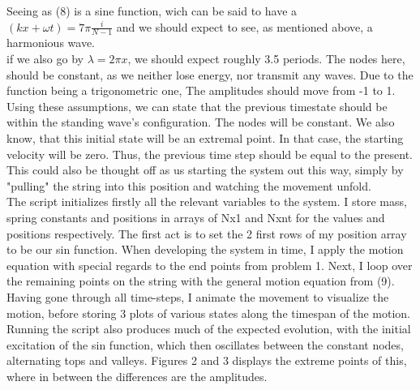 \documentclass[12pt]{article}
\begin{document}
	Seeing as (8) is a sine function, wich can be said to have a \\$(kx + \omega t) = 7\pi\frac{i}{N-1}$ and we should expect to see, as mentioned above, a harmonious wave.\\
	if we also go by $\lambda = 2\pi x$, we should expect roughly 3.5 periods. The nodes here, should be constant, as we neither lose energy, nor transmit any waves. Due to the function being a trigonometric one, The amplitudes should move from -1 to 1.
	Using these assumptions, we can state that the previous timestate should be within the standing wave's configuration. The nodes will be constant. We also know, that this initial state will be an extremal point. In that case, the starting velocity will be zero. Thus, the previous time step should be equal to the present. This could also be thought off as us starting the system out this way, simply by "pulling" the string into this position and watching the movement unfold. \\
	The script initializes firstly all the relevant variables to the system. I store mass, spring constants and positions in arrays of Nx1 and Nxnt for the values and positions respectively.
	 The first act is to set the 2 first rows of my position array to be our sin function. When developing the system in time, I apply the motion equation with special regards to the end points from problem 1. Next, I loop over the remaining points on the string with the general motion equation from (9). Having gone through all time-steps, I animate the movement to visualize the motion, before storing 3 plots of various states along the timespan of the motion. \\
	Running the script also produces much of the expected evolution, with the initial excitation of the sin function, which then oscillates between the constant nodes, alternating tops and valleys. Figures 2 and 3 displays the extreme points of this, where in between the differences are the amplitudes. 
	
\end{document}
